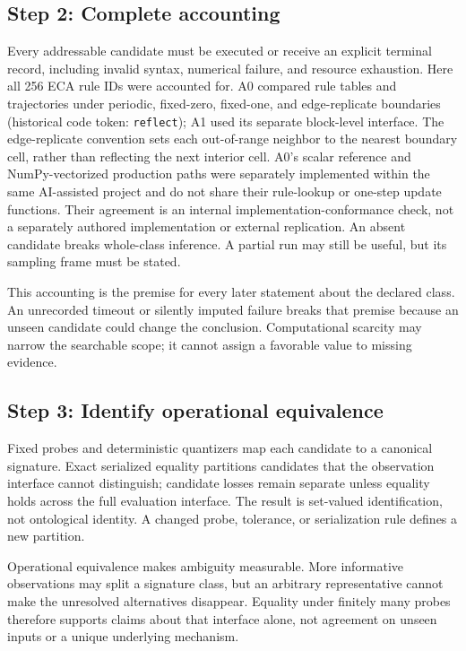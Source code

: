 \documentclass[10pt]{article}
\theoremstyle{definition}
\begin{document}
\subsection{Step 2: Complete accounting}

Every addressable candidate must be executed or receive an explicit terminal record, including
invalid syntax, numerical failure, and resource exhaustion. Here all 256 ECA rule IDs were
accounted for. A0 compared rule tables and trajectories under periodic, fixed-zero,
fixed-one, and edge-replicate boundaries (historical code token: \texttt{reflect}); A1 used its
separate block-level interface. The edge-replicate convention sets each out-of-range neighbor to
the nearest boundary cell, rather than reflecting the next interior cell. A0's scalar
reference and NumPy-vectorized production paths were separately implemented within the same
AI-assisted project and do not share their rule-lookup or one-step update functions. Their
agreement is an internal implementation-conformance check, not a separately authored
implementation or external replication.
An absent candidate
breaks whole-class inference. A partial run may still be useful, but its sampling frame must be
stated.

This accounting is the premise for every later statement about the declared class. An unrecorded
timeout or silently imputed failure breaks that premise because an unseen candidate could change
the conclusion. Computational scarcity may narrow the searchable scope; it cannot assign a
favorable value to missing evidence.

\subsection{Step 3: Identify operational equivalence}

Fixed probes and deterministic quantizers map each candidate to a canonical signature. Exact
serialized equality partitions candidates that the observation interface cannot distinguish;
candidate losses remain separate unless equality holds across the full evaluation interface.
The result is set-valued identification, not ontological identity. A changed probe, tolerance, or
serialization rule defines a new partition.

Operational equivalence makes ambiguity measurable. More informative observations may split a
signature class, but an arbitrary representative cannot make the unresolved alternatives
disappear. Equality under finitely many probes therefore supports claims about that interface
alone, not agreement on unseen inputs or a unique underlying mechanism.
\end{document}
